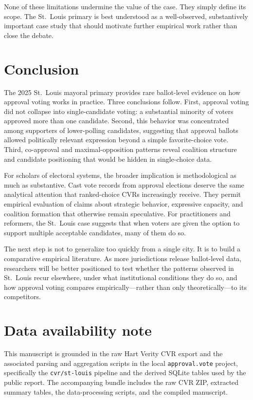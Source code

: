 \documentclass[11pt]{article}
\begin{document}
None of these limitations undermine the value of the case. They simply define its scope. The St.~Louis primary is best understood as a well-observed, substantively important case study that should motivate further empirical work rather than close the debate.

\section{Conclusion}
The 2025 St.~Louis mayoral primary provides rare ballot-level evidence on how approval voting works in practice. Three conclusions follow. First, approval voting did not collapse into single-candidate voting: a substantial minority of voters approved more than one candidate. Second, this behavior was concentrated among supporters of lower-polling candidates, suggesting that approval ballots allowed politically relevant expression beyond a simple favorite-choice vote. Third, co-approval and maximal-opposition patterns reveal coalition structure and candidate positioning that would be hidden in single-choice data.

For scholars of electoral systems, the broader implication is methodological as much as substantive. Cast vote records from approval elections deserve the same analytical attention that ranked-choice CVRs increasingly receive. They permit empirical evaluation of claims about strategic behavior, expressive capacity, and coalition formation that otherwise remain speculative. For practitioners and reformers, the St.~Louis case suggests that when voters are given the option to support multiple acceptable candidates, many of them do so.

The next step is not to generalize too quickly from a single city. It is to build a comparative empirical literature. As more jurisdictions release ballot-level data, researchers will be better positioned to test whether the patterns observed in St.~Louis recur elsewhere, under what institutional conditions they do so, and how approval voting compares empirically---rather than only theoretically---to its competitors.

\section*{Data availability note}
This manuscript is grounded in the raw Hart Verity CVR export and the associated parsing and aggregation scripts in the local \texttt{approval.vote} project, specifically the \texttt{cvr/st-louis} pipeline and the derived SQLite tables used by the public report. The accompanying bundle includes the raw CVR ZIP, extracted summary tables, the data-processing scripts, and the compiled manuscript.
\end{document}
